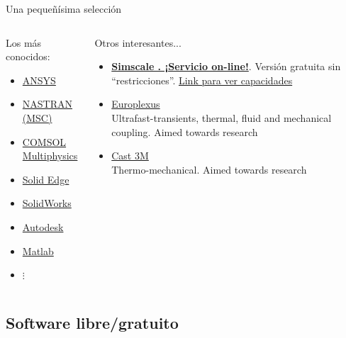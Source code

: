 \documentclass[12pt]{beamer}
\begin{document}
\begin{frame}{Una pequeñísima selección}
	\begin{columns}
		\begin{column}{0.5\textwidth}
			Los más conocidos:
			\begin{itemize}
				\item \href{https://www.ansys.com}{ANSYS \textregistered}
				\item \href{https://www.mscsoftware.com}{NASTRAN (MSC) \textregistered}
				\item \href{https://www.comsol.com}{COMSOL Multiphysics \textregistered}
				\item \href{https://solidedge.siemens.com/en/solutions/products/simulation/}{Solid Edge \textregistered}
				\item \href{https://www.solidworks.com/category/simulation-solutions}{SolidWorks \textregistered}
				\item \href{https://www.autodesk.com/solutions/simulation/overview}{Autodesk \textregistered}
				\item \href{https://www.mathworks.com/}{Matlab \textregistered}
				\item $\vdots$
			\end{itemize}
		\end{column}
		\begin{column}{0.6\textwidth}
			Otros interesantes...
			\begin{itemize}
				\item \href{https://www.simscale.com/}{\textbf{Simscale \textregistered. ¡Servicio on-line!}}. Versión gratuita sin ``restricciones''. \href{https://marketing.simscale.com/acton/attachment/14483/f-0336/1/-/-/-/-/SimScale_Simulation_Features_Overview.pdf}{Link para ver capacidades}
				\item \href{https://europlexus.jrc.ec.europa.eu/public/manual_pdf/manual.pdf}{Europlexus \textregistered} \\ Ultrafast-transients, thermal, fluid and mechanical coupling. Aimed towards research
				\item \href{http://www-cast3m.cea.fr/}{Cast 3M \textregistered} \\ Thermo-mechanical. Aimed towards research
			\end{itemize}
		\end{column}
	\end{columns}
\end{frame}

\subsection{Software libre/gratuito}
\end{document}
